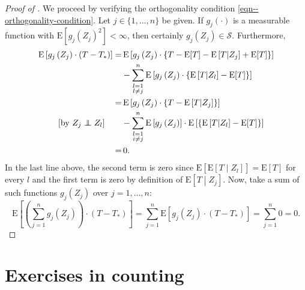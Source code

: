 \documentclass[12pt]{article}
\newcommand{\indep}{\mathrel{\perp \mspace{-11mu} \perp}}
\numberwithin{equation}{section}
\theoremstyle{definition}
\theoremstyle{plain}
\begin{document}
\begin{proof}[Proof of ]
We proceed by verifying the orthogonality condition
\eqref{eqn--orthogonality-condition}.
Let \(j \in \{1, \dots, n\}\) be given.
If \(g_{j} (\cdot)\) is a measurable function with \(\mathrm{E} \left[ g_{j}
\left( Z_{j} \right)^{2} \right] < \infty\), then certainly \(g_{j} \left( Z_{j}
\right) \in \mathcal{S}\).
Furthermore,
\begin{align*}
  \mathrm{E} \left[ g_{j} \left( Z_{j} \right) \cdot \left( T - T_{\ast} \right)
  \right] =
  & \, \mathrm{E} \left[ g_{j} \left( Z_{j} \right) \cdot \left\{ T - \mathrm{E}
  [T] - \mathrm{E} \left[ T \middle| Z_{j} \right] + \mathrm{E} [T] \right\}
  \right] \\
  & - \sum_{\substack{l = 1 \\ l \neq j}}^{n} \mathrm{E} \left[ g_{j} \left(
  Z_{j} \right) \cdot \left\{ \mathrm{E} \left[ T \middle| Z_{l} \right] -
  \mathrm{E} [T] \right\} \right] \\
  =
  & \, \mathrm{E} \left[ g_{j} \left( Z_{j} \right) \cdot \left\{ T - \mathrm{E}
  \left[ T \middle| Z_{j} \right] \right\}
  \right] \\
  [\text{by } Z_{j} \indep Z_{l}] \qquad & - \sum_{\substack{l = 1 \\ i
  \neq j}}^{n} \mathrm{E} \left[ g_{j} \left( Z_{j} \right) \right] \cdot
  \mathrm{E} \left[ \left\{ \mathrm{E} \left[ T \middle| Z_{l} \right] -
  \mathrm{E} [T] \right\} \right] \\
  =
  & \, 0.
\end{align*}
In the last line above, the second term is zero since \(\mathrm{E} \left[
\mathrm{E} \left[ T \middle| Z_{l} \right] \right] = \mathrm{E} [T]\) for every
\(l\) and the first term is zero by definition of \(\mathrm{E} \left[ T \middle|
Z_{j} \right]\).
Now, take a sum of such functions \(g_{j} \left( Z_{j} \right)\) over \(j = 1,
\dots, n\):
\begin{equation*}
  \mathrm{E} \left[ \left( \sum_{j = 1}^{n} g_{j} \left( Z_{j} \right) \right)
  \cdot \left( T - T_{\ast} \right) \right] = \sum_{j = 1}^{n} \mathrm{E} \left[
  g_{j} \left( Z_{j} \right) \cdot \left( T - T_{\ast} \right) \right] = \sum_{j
  = 1}^{n} 0 = 0.
\end{equation*}
\end{proof}

\section{Exercises in counting}
\end{document}
